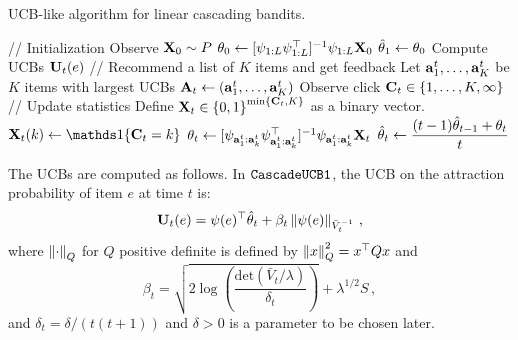 \begin{algorithm}[t]
  \caption{UCB-like algorithm for linear cascading bandits.}
  \label{alg:ucb}
  \begin{algorithmic}
    \STATE // Initialization
    \STATE Observe $\mathbf{X}_0 \sim P$
    \STATE $\mathbf{\theta}_0 \gets [\psi_{1:L} \psi_{1:L}^\top]^{-1} \psi_{1:L} \mathbf{X}_0$
    \STATE $\hat{\mathbf{\theta}}_1 \gets \mathbf{\theta}_0$
    \STATE
      \STATE Compute UCBs $\mathbf{U}_t(e)$ %
      \STATE
      \STATE // Recommend a list of $K$ items and get feedback
      \STATE Let $\mathbf{a}^t_1, \dots, \mathbf{a}^t_K$ be $K$ items with largest UCBs
      \STATE $\mathbf{A}_t \gets (\mathbf{a}^t_1, \dots, \mathbf{a}^t_K)$
      \STATE Observe click $\mathbf{C}_t \in \left\{1, \dots, K, \infty\right\}$
      \STATE
      \STATE // Update statistics
      \STATE Define $\mathbf{X}_t \in \left\{0,1\right\}^{\min \left\{\mathbf{C}_t, K\right\}}$ as a binary vector.
        \STATE $\rnd{X}_t(k) \gets \I{\rnd{C}_t = k}$
      \ENDFOR
      \STATE $\mathbf{\theta}_t \gets [\psi_{\mathbf{a}^t_1:\mathbf{a}^t_k} \psi_{\mathbf{a}^t_1:\mathbf{a}^t_k}^\top]^{-1} \psi_{\mathbf{a}^t_1:\mathbf{a}^t_k} \mathbf{X}_t$
      \STATE $\displaystyle \hat{\mathbf{\theta}}_t \gets \frac{(t - 1) \hat{\mathbf{\theta}}_{t - 1} + \mathbf{\theta}_t}{t}$
    \ENDFOR
  \end{algorithmic}
\end{algorithm}

The UCBs are computed as follows. In ${\tt CascadeUCB1}$, the UCB on the attraction probability of item $e$ at time $t$ is:
\begin{align*}
  \mathbf{U}_t(e) = \psi(e)^\top \hat{\mathbf{\theta}}_t + \beta_t \left\|\psi(e) \right\|_{\bar{V}_t^{-1}}\,,
\end{align*}
where $\left\|\cdot\right\|_Q$ for $Q$ positive definite is defined by
$\left\|x\right\|^2_Q  = x^\top Q x$ and
\[
\beta_t = \sqrt{2 \log\left(\frac{\mathrm{det}(\bar{V}_t/\lambda)}{\delta_t}\right)} + \lambda^{1/2} S\,,
\]
and $\delta_t = \delta/(t(t+1))$ and $\delta>0$ is a parameter to be chosen later.


